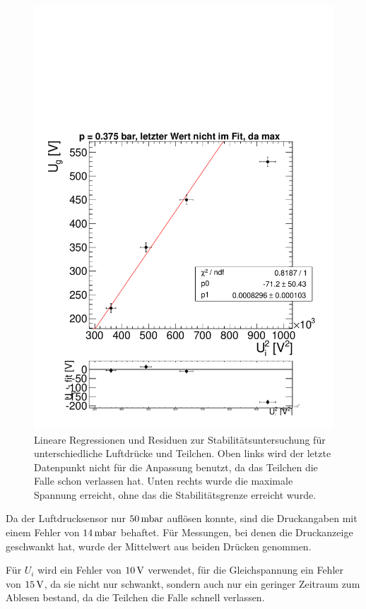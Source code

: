 \documentclass[a4paper,12pt]{article}
\begin{document}
\begin{figure}[htb]
		\includegraphics[height = 0.3\textheight]{linReg375bar.pdf}
		\caption{Lineare Regressionen und Residuen zur Stabilitätsuntersuchung für unterschiedliche Luftdrücke und Teilchen.
			Oben links wird der letzte Datenpunkt nicht für die Anpassung benutzt, da das Teilchen die Falle schon verlassen hat.
			Unten rechts wurde die maximale Spannung erreicht, ohne das die Stabilitätsgrenze erreicht wurde.
		}
		\label{linReg}
\end{figure}

Da der Luftdrucksensor nur $\unit[50]{mbar}$ auflösen konnte, sind die Druckangaben mit einem Fehler von $\unit[14]{mbar}$ behaftet.
Für Messungen, bei denen die Druckanzeige geschwankt hat, wurde der Mittelwert aus beiden Drücken genommen.


Für $U_i$ wird ein Fehler von $\unit[10]{V}$ verwendet, für die Gleichspannung ein Fehler von $\unit[15]{V}$, da sie nicht nur schwankt, sondern auch nur ein geringer Zeitraum zum Ablesen bestand, da die Teilchen die Falle schnell verlassen.
\end{document}
